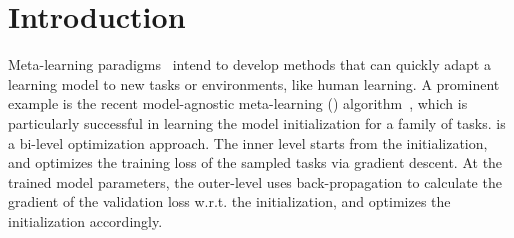 \section{Introduction}
Meta-learning paradigms~\citep{schmidhuber1987evolutionary, thrun2012learning} intend to  develop methods that can quickly adapt a learning model to new tasks or environments, like human learning. A prominent example is the recent model-agnostic meta-learning (\maml) algorithm~\citep{finn2017model}, which is particularly successful in learning the model initialization for a family of tasks. \maml is a bi-level optimization approach. The inner level starts from the initialization, and optimizes the training loss of the sampled tasks via gradient descent. At the trained model parameters, the outer-level uses back-propagation to calculate the gradient of the validation loss w.r.t. the initialization, and optimizes the initialization accordingly. 


